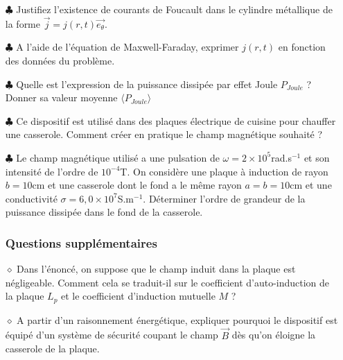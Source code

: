 \documentclass{report}
\begin{document}
\begin{itemize}

	\item[$\clubsuit$] Justifiez l'existence de courants de Foucault dans le cylindre métallique de la forme $\vec{j}=j(r,t)\vec{e_\theta}$.
	
	\item[$\clubsuit$] A l'aide de l'équation de Maxwell-Faraday, exprimer $j(r,t)$ en fonction des données du problème.
	
	\item[$\clubsuit$] Quelle est l'expression de la puissance dissipée par effet Joule $P_{Joule}$ ? Donner sa valeur moyenne $\langle P_{Joule}\rangle$
	
	\item[$\clubsuit$] Ce dispositif est utilisé dans des plaques électrique de cuisine pour chauffer une casserole. Comment créer en pratique le champ magnétique souhaité ?
	
	\item[$\clubsuit$] Le champ magnétique utilisé a une pulsation de $\omega=2\times10^{5}$rad.s$^{-1}$ et son intensité de l'ordre de $10^{-4}$T. On considère une plaque à induction de rayon $b=10$cm et une casserole dont le fond a le même rayon $a=b=10$cm et une conductivité $\sigma=6,0\times10^{7}$S.m$^{-1}$. Déterminer l'ordre de grandeur de la puissance dissipée dans le fond de la casserole. 

\subsubsection*{Questions supplémentaires}

	\item[$\diamond$] Dans l'énoncé, on suppose que le champ induit dans la plaque est négligeable. Comment cela se traduit-il sur le coefficient d'auto-induction de la plaque $L_p$ et le coefficient d'induction mutuelle $M$ ?
	
	\item[$\diamond$] A partir d'un raisonnement énergétique, expliquer pourquoi le dispositif est équipé d'un système de sécurité coupant le champ $\vec{B}$ dès qu'on éloigne la casserole de la plaque.

\end{itemize}
\end{document}
